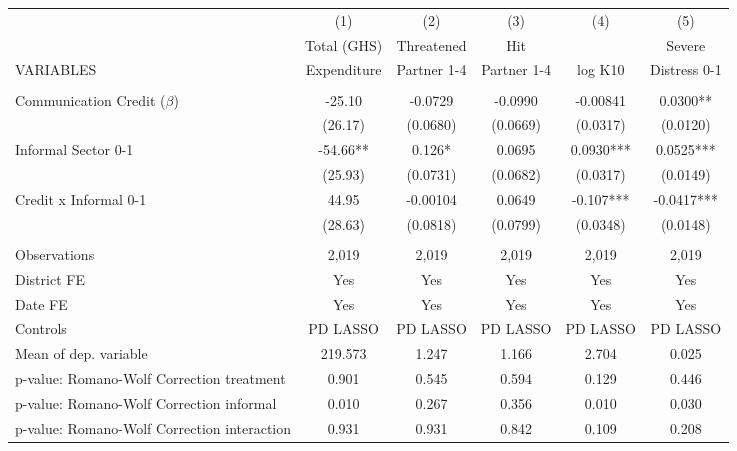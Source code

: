 \begin{tabular}{lccccc} \hline
 & (1) & (2) & (3) & (4) & (5) \\
 & Total (GHS) & Threatened & Hit &  & Severe \\
VARIABLES & Expenditure & Partner 1-4 & Partner 1-4 & log K10 & Distress 0-1 \\ \hline
 &  &  &  &  &  \\
Communication Credit ($\beta$) & -25.10 & -0.0729 & -0.0990 & -0.00841 & 0.0300** \\
 & (26.17) & (0.0680) & (0.0669) & (0.0317) & (0.0120) \\
Informal Sector 0-1 & -54.66** & 0.126* & 0.0695 & 0.0930*** & 0.0525*** \\
 & (25.93) & (0.0731) & (0.0682) & (0.0317) & (0.0149) \\
Credit x Informal 0-1 & 44.95 & -0.00104 & 0.0649 & -0.107*** & -0.0417*** \\
 & (28.63) & (0.0818) & (0.0799) & (0.0348) & (0.0148) \\
 &  &  &  &  &  \\
Observations & 2,019 & 2,019 & 2,019 & 2,019 & 2,019 \\
District FE & Yes & Yes & Yes & Yes & Yes \\
Date FE & Yes & Yes & Yes & Yes & Yes \\
Controls & PD LASSO & PD LASSO & PD LASSO & PD LASSO & PD LASSO \\
Mean of dep. variable & 219.573 & 1.247 & 1.166 & 2.704 & 0.025 \\
p-value: Romano-Wolf Correction treatment & 0.901 & 0.545 & 0.594 & 0.129 & 0.446 \\
p-value: Romano-Wolf Correction informal & 0.010 & 0.267 & 0.356 & 0.010 & 0.030 \\
 p-value: Romano-Wolf Correction interaction & 0.931 & 0.931 & 0.842 & 0.109 & 0.208 \\ \hline
\end{tabular}
